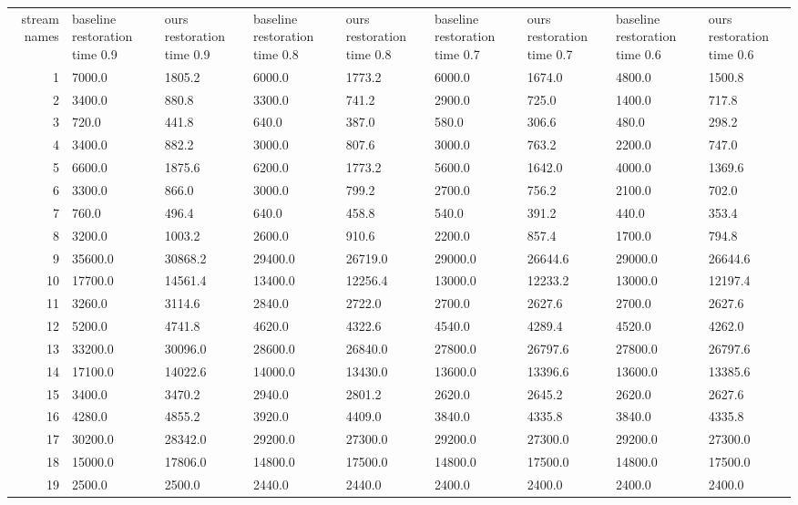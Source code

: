\begin{tabular}{|r|l|l|l|l|l|l|l|l|}
  \hline
  stream names & baseline restoration time 0.9 & ours restoration time 0.9 & baseline restoration time 0.8 & ours restoration time 0.8 & baseline restoration time 0.7 & ours restoration time 0.7 & baseline restoration time 0.6 & ours restoration time 0.6 \\ 
  1 & 7000.0 & 1805.2 & 6000.0 & 1773.2 & 6000.0 & 1674.0 & 4800.0 & 1500.8 \\ 
  2 & 3400.0 & 880.8 & 3300.0 & 741.2 & 2900.0 & 725.0 & 1400.0 & 717.8 \\ 
  3 & 720.0 & 441.8 & 640.0 & 387.0 & 580.0 & 306.6 & 480.0 & 298.2 \\ 
  4 & 3400.0 & 882.2 & 3000.0 & 807.6 & 3000.0 & 763.2 & 2200.0 & 747.0 \\ 
  5 & 6600.0 & 1875.6 & 6200.0 & 1773.2 & 5600.0 & 1642.0 & 4000.0 & 1369.6 \\ 
  6 & 3300.0 & 866.0 & 3000.0 & 799.2 & 2700.0 & 756.2 & 2100.0 & 702.0 \\ 
  7 & 760.0 & 496.4 & 640.0 & 458.8 & 540.0 & 391.2 & 440.0 & 353.4 \\ 
  8 & 3200.0 & 1003.2 & 2600.0 & 910.6 & 2200.0 & 857.4 & 1700.0 & 794.8 \\ 
  9 & 35600.0 & 30868.2 & 29400.0 & 26719.0 & 29000.0 & 26644.6 & 29000.0 & 26644.6 \\ 
  10 & 17700.0 & 14561.4 & 13400.0 & 12256.4 & 13000.0 & 12233.2 & 13000.0 & 12197.4 \\ 
  11 & 3260.0 & 3114.6 & 2840.0 & 2722.0 & 2700.0 & 2627.6 & 2700.0 & 2627.6 \\ 
  12 & 5200.0 & 4741.8 & 4620.0 & 4322.6 & 4540.0 & 4289.4 & 4520.0 & 4262.0 \\ 
  13 & 33200.0 & 30096.0 & 28600.0 & 26840.0 & 27800.0 & 26797.6 & 27800.0 & 26797.6 \\ 
  14 & 17100.0 & 14022.6 & 14000.0 & 13430.0 & 13600.0 & 13396.6 & 13600.0 & 13385.6 \\ 
  15 & 3400.0 & 3470.2 & 2940.0 & 2801.2 & 2620.0 & 2645.2 & 2620.0 & 2627.6 \\ 
  16 & 4280.0 & 4855.2 & 3920.0 & 4409.0 & 3840.0 & 4335.8 & 3840.0 & 4335.8 \\ 
  17 & 30200.0 & 28342.0 & 29200.0 & 27300.0 & 29200.0 & 27300.0 & 29200.0 & 27300.0 \\ 
  18 & 15000.0 & 17806.0 & 14800.0 & 17500.0 & 14800.0 & 17500.0 & 14800.0 & 17500.0 \\ 
  19 & 2500.0 & 2500.0 & 2440.0 & 2440.0 & 2400.0 & 2400.0 & 2400.0 & 2400.0 \\ 

\end{tabular}
